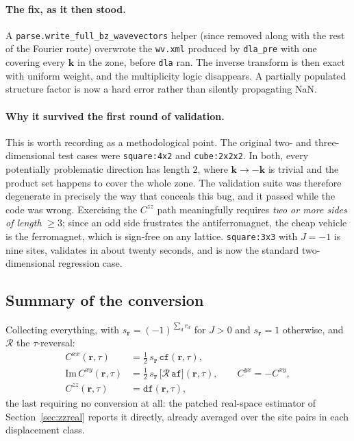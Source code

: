 \documentclass[11pt,a4paper]{article}
\newcommand{\code}[1]{\texttt{#1}}
\begin{document}
\paragraph{The fix, as it then stood.} A \code{parse.write\_full\_bz\_wavevectors}
helper (since removed along with the rest of the Fourier route) overwrote the
\code{wv.xml} produced by \code{dla\_pre} with one covering every $\mathbf{k}$ in
the zone, before \code{dla} ran. The inverse transform is then
exact with uniform weight, and the multiplicity logic disappears. A partially
populated structure factor is now a hard error rather than silently propagating
NaN.

\paragraph{Why it survived the first round of validation.} This is worth
recording as a methodological point. The original two- and three-dimensional
test cases were \code{square:4x2} and \code{cube:2x2x2}. In both, every
potentially problematic direction has length $2$, where $\mathbf{k}\to-\mathbf{k}$
is trivial and the product set happens to cover the whole zone. The validation
suite was therefore degenerate in precisely the way that conceals this bug, and
it passed while the code was wrong. Exercising the $C^{zz}$ path meaningfully
requires \emph{two or more sides of length} $\geq3$; since an odd side frustrates
the antiferromagnet, the cheap vehicle is the ferromagnet, which is sign-free on
any lattice. \code{square:3x3} with $J=-1$ is nine sites, validates in about
twenty seconds, and is now the standard two-dimensional regression case.

\subsection{Summary of the conversion}

Collecting everything, with $s_{\mathbf r}=(-1)^{\sum_d r_d}$ for $J>0$ and
$s_{\mathbf r}=1$ otherwise, and $\mathcal{R}$ the $\tau$-reversal:
\begin{align}
  C^{xx}(\mathbf{r},\tau) &= \tfrac12\, s_{\mathbf r}\, \code{cf}(\mathbf{r},\tau), \\
  \mathrm{Im}\,C^{xy}(\mathbf{r},\tau) &= \tfrac12\, s_{\mathbf r}\,
      \bigl[\mathcal{R}\,\code{af}\bigr](\mathbf{r},\tau),
      \qquad C^{yx}=-C^{xy}, \\
  C^{zz}(\mathbf{r},\tau) &= \code{df}(\mathbf{r},\tau),
\end{align}
the last requiring no conversion at all: the patched real-space estimator of
Section~\ref{sec:zzreal} reports it directly, already averaged over the site
pairs in each displacement class.
\end{document}
